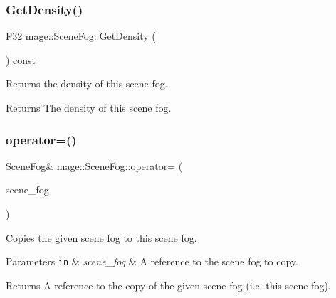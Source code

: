 \subsubsection{\texorpdfstring{Get\+Density()}{GetDensity()}}
{\footnotesize\ttfamily \hyperlink{namespacemage_aa97e833b45f06d60a0a9c4fc22ae02c0}{F32} mage\+::\+Scene\+Fog\+::\+Get\+Density (\begin{DoxyParamCaption}{ }\end{DoxyParamCaption}) const\hspace{0.3cm}{\ttfamily [noexcept]}}

Returns the density of this scene fog.

\begin{DoxyReturn}{Returns}
The density of this scene fog. 
\end{DoxyReturn}
\hypertarget{classmage_1_1_scene_fog_a2312784458fe9d8e88dcfe5c444866a4}{}\label{classmage_1_1_scene_fog_a2312784458fe9d8e88dcfe5c444866a4} 
\subsubsection{\texorpdfstring{operator=()}{operator=()}\hspace{0.1cm}{\footnotesize\ttfamily [1/2]}}
{\footnotesize\ttfamily \hyperlink{classmage_1_1_scene_fog}{Scene\+Fog}\& mage\+::\+Scene\+Fog\+::operator= (\begin{DoxyParamCaption}\item[{const \hyperlink{classmage_1_1_scene_fog}{Scene\+Fog} \&}]{scene\+\_\+fog }\end{DoxyParamCaption})\hspace{0.3cm}{\ttfamily [default]}}

Copies the given scene fog to this scene fog.


\begin{DoxyParams}[1]{Parameters}
\mbox{\tt in}  & {\em scene\+\_\+fog} & A reference to the scene fog to copy. \\
\hline
\end{DoxyParams}
\begin{DoxyReturn}{Returns}
A reference to the copy of the given scene fog (i.\+e. this scene fog). 
\end{DoxyReturn}
\hypertarget{classmage_1_1_scene_fog_af019127d949d50173c9d4af51a8dcaef}{}\label{classmage_1_1_scene_fog_af019127d949d50173c9d4af51a8dcaef} 

